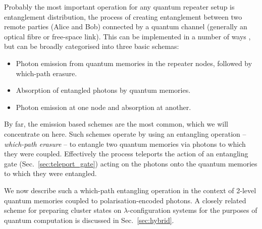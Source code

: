 Probably the most important operation for any quantum repeater setup is entanglement distribution, the process of creating entanglement between two remote parties (Alice and Bob) connected by a quantum channel (generally an optical fibre or free-space link). This can be implemented in a number of ways \cite{bib:Bennett96, bib:enk98, bib:bennett93, bib:SSRG09, bib:childress06, bib:loock06, bib:munro08}, but can be broadly categorised into three basic schemas:
\begin{itemize}
\item Photon emission from quantum memories in the repeater nodes, followed by which-path erasure.
\item Absorption of entangled photons by quantum memories.
\item Photon emission at one node and absorption at another.
\end{itemize}
By far, the emission based schemes are the most common, which we will concentrate on here. Such schemes operate by using an entangling operation -- \textit{which-path erasure} -- to entangle two quantum memories via photons to which they were coupled. Effectively the process teleports the action of an entangling gate (Sec.~\ref{sec:teleport_gate}) acting on the photons onto the quantum memories to which they were entangled.

We now describe such a which-path entangling operation in the context of 2-level quantum memories coupled to polarisation-encoded photons. A closely related scheme for preparing cluster states on $\lambda$-configuration systems for the purposes of quantum computation is discussed in Sec.~\ref{sec:hybrid}.

